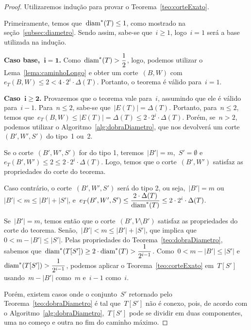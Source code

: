 	\medskip
	\medskip

	\begin{proof}
		Utilizaremos indução para provar o Teorema~\ref{teo:corteExato}.
		
		Primeiramente, temos que~${\mathrm{diam}^*(T)\le1}$, como mostrado 
		na seção~\ref{subsec:diametro}. 
		Sendo assim, sabe-se que~${i\ge1}$, logo~${i=1}$ será a base 
		utilizada na indução.
		
		\textbf{Caso base,~${\mathbf {i=1}}$.}
		Como~${\mathrm{diam}^*(T)>\dfrac{1}{2}}$, logo, 
		podemos utilizar o Lema~\ref{lema:caminhoLongo} e obter 
		um corte~$(B,W)$ 
		com~${e_T(B,W)\le 2 < 4\cdot 2^i\cdot \Delta(T)}$.
		Portanto, o teorema é válido para~${i=1}$.


		\textbf{Caso~${\mathbf{i\ge 2}}$.} Provaremos que 
		o teorema
		vale para~$i$, assumindo que ele é válido para~$i-1$.
		Para~${n\le 2}$, sabe-se que~${|E(T)|=\Delta(T)}$. Portanto, 
		para~${n\le 2}$, temos 
		que~${e_T(B,W)\le |E(T)|=\Delta(T)\le 2\cdot 2^i\cdot 
		\Delta(T)}$.
		Porém, se~${n>2}$, podemos utilizar o 
		Algoritmo~\ref{alg:dobraDiametro}, que nos devolverá um 
		corte~$(B',W',S')$ do tipo~1 ou~2.

			Se o corte~$(B',W',S')$ for do tipo 1, 
			teremos~${|B'|=m}$,~${S'=\emptyset}$
			e~${e_T(B',W')\le2\le 2\cdot 2^i\cdot \Delta(T)}$.
			Logo, temos que o corte~$(B',W')$ satisfaz as propriedades
			do corte do teorema.

			Caso contrário, o corte~$(B',W',S')$ será do tipo 2, ou 
			seja,~${|B'|=m}$ ou~${|B'|<m\le |B'|+|S'|}$, 
			e~${e_T(B',W',S')\le \dfrac{2\cdot\Delta(T)}{\mathrm{diam}^*(T)}\le
			2\cdot2^i\cdot\Delta(T)}$.
			
			Se~${|B'|=m}$, temos então que o corte~$(B',V\setminus B')$ satisfaz
			as propriedades do corte do
			teorema.
			Senão,~${|B'|<m\le |B'|+|S'|}$, que implica
			que~${0<m-|B'|\le|S'|}$. 
			Pelas propriedades do Teorema~\ref{teo:dobraDiametro}, 
			sabemos que~${\mathrm{diam}^*(T[S'])\ge 2\cdot \mathrm{diam}^*(T)>
			\dfrac{1}{2^{i-1}}}$.
			Como~${0<m-|B'|\le|S'|}$ 
			e~${\mathrm{diam}^*(T[S'])>\dfrac{1}{2^{i-1}}}$, podemos aplicar o 
			Teorema~\ref{teo:corteExato} em~$T[S']$ 
			usando~${m-|B'|}$ como~$m$ e~$i-1$ como~$i$.
			
			Porém, existem casos onde o conjunto~$S'$ retornado 
			pelo Teorema~\ref{teo:dobraDiametro} é tal que~$T[S']$ 
			não é conexo, 
			pois, de acordo com o 
			Algoritmo~\ref{alg:dobraDiametro},~$T[S']$ pode se 
			dividir em duas componentes, uma no começo e outra
			no fim do caminho máximo. 


\end{proof}
